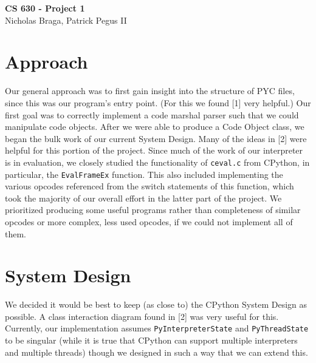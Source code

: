 \documentclass{article}
\begin{document}
\begin{center}
{\LARGE \bf CS 630 - Project 1}\\
\vspace*{0.1cm}
{\normalsize Nicholas Braga, Patrick Pegus II}
\end{center}

\section*{Approach}

Our general approach was to first gain insight into the structure of PYC files, since this was our program's entry point. (For this we found [1] very helpful.) Our first goal was to correctly implement a code marshal parser such that we could manipulate code objects. After we were able to produce a Code Object class, we began the bulk work of our current System Design. Many of the ideas in [2] were helpful for this portion of the project. Since much of the work of our interpreter is in evaluation, we closely studied the functionality of \texttt{ceval.c} from CPython, in particular, the \texttt{EvalFrameEx} function. This also included implementing the various opcodes referenced from the switch statements of this function, which took the majority of our overall effort in the latter part of the project. We prioritized producing some useful programs rather than completeness of similar opcodes or more complex, less used opcodes, if we could not implement all of them.

\section*{System Design}

We decided it would be best to keep (as close to) the CPython System Design as possible. A class interaction diagram found in [2] was very useful for this. Currently, our implementation assumes \texttt{PyInterpreterState} and \texttt{PyThreadState} to be singular (while it is true that CPython can support multiple interpreters and multiple threads) though we designed in such a way that we can extend this. 
\end{document}
